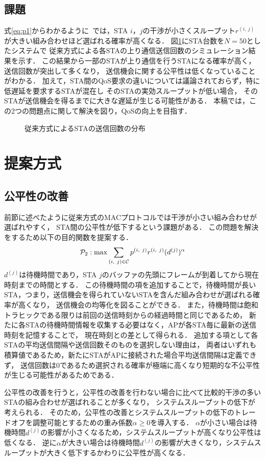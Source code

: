 \documentclass[technicalreport]{ieicej}
\newcommand{\sij}{(i,\ j)}
\newcommand{\rij}{r^{\sij}}
\begin{document}
	\subsection{課題}
		式\eqref{eq:p1}からわかるように~\cite{promac}では，STA $i$，$j$の干渉が小さくスループット$\rij$が大きい組み合わせほど選ばれる確率が高くなる．
		図\ref{fig:numtx}にSTA台数を$N=50$としたシステムで
		従来方式による各STAの上り通信送信回数のシミュレーション結果を示す．
		この結果から一部のSTAが上り通信を行うSTAになる確率が高く，送信回数が突出して多くなり，
		送信機会に関する公平性は低くなっていることがわかる．
		加えて，STA間のQoS要求の違いについては議論されておらず，特に低遅延を要求するSTAが混在し
		そのSTAの実効スループットが低い場合，
		そのSTAが送信機会を得るまでに大きな遅延が生じる可能性がある．
		本稿では，この2つの問題点に関して解決を図り，QoSの向上を目指す．

		\begin{figure}[t]
			\centering
			\caption{従来方式によるSTAの送信回数の分布}
			\label{fig:numtx}
		\end{figure}

\section{提案方式}
\subsection{公平性の改善}\label{sec:fair}
	前節に述べたように従来方式のMACプロトコルでは干渉が小さい組み合わせが選ばれやすく，
	STA間の公平性が低下するという課題がある．
	この問題を解決をするため以下の目的関数を提案する．
	\begin{equation}
		{\mathcal P}_2: {\rm max} \sum_{(i,\ j)\in{\mathcal C}} p^{(i,\ j)}r^{(i,\ j)}(d^{(j)})^{\alpha} \label{eq:p2}
	\end{equation}
	$d^{(j)}$は待機時間であり，STA $j$のバッファの先頭にフレームが到着してから現在時刻までの時間とする．
	この待機時間の項を追加することで，待機時間が長いSTA，つまり，送信機会を得られていないSTAを含んだ組み合わせが選ばれる確率が高くなり，
	送信機会の均等化を図ることができる．
	また，待機時間は飽和トラヒックである限りは前回の送信時刻からの経過時間と同じであるため，
	新たに各STAの待機時間情報を収集する必要はなく，APが各STA毎に最新の送信時刻を記憶することで，
	現在時刻との差として得られる．
	追加する項として各STAの平均送信間隔や送信回数そのものを選択しない理由は，
	両者はいずれも積算値であるため，新たにSTAがAPに接続された場合平均送信間隔は定義できず，
	送信回数は0であるため選択される確率が極端に高くなり短期的な不公平性が生じる可能性があるためである．
	\par
	公平性の改善を行うと，公平性の改善を行わない場合に比べて比較的干渉の多いSTAの組み合わせが選ばれることが多くなり，
	システムスループットの低下が考えられる．
	そのため，公平性の改善とシステムスループットの低下のトレードオフを調整可能とするための重み係数$\alpha\geq 0$を導入する．
	$\alpha$が小さい場合は待機時間$d^{(j)}$の影響が小さくなるため，システムスループットが高くなり公平性は低くなる．
	逆に$\alpha$が大きい場合は待機時間$d^{(j)}$の影響が大きくなり，システムスループットが大きく低下するかわりに公平性が高くなる．
\end{document}
